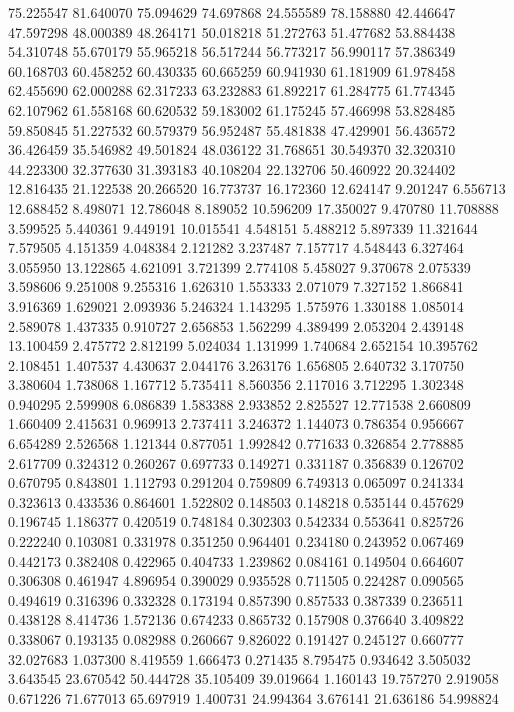 75.225547
81.640070
75.094629
74.697868
24.555589
78.158880
42.446647
47.597298
48.000389
48.264171
50.018218
51.272763
51.477682
53.884438
54.310748
55.670179
55.965218
56.517244
56.773217
56.990117
57.386349
60.168703
60.458252
60.430335
60.665259
60.941930
61.181909
61.978458
62.455690
62.000288
62.317233
63.232883
61.892217
61.284775
61.774345
62.107962
61.558168
60.620532
59.183002
61.175245
57.466998
53.828485
59.850845
51.227532
60.579379
56.952487
55.481838
47.429901
56.436572
36.426459
35.546982
49.501824
48.036122
31.768651
30.549370
32.320310
44.223300
32.377630
31.393183
40.108204
22.132706
50.460922
20.324402
12.816435
21.122538
20.266520
16.773737
16.172360
12.624147
9.201247
6.556713
12.688452
8.498071
12.786048
8.189052
10.596209
17.350027
9.470780
11.708888
3.599525
5.440361
9.449191
10.015541
4.548151
5.488212
5.897339
11.321644
7.579505
4.151359
4.048384
2.121282
3.237487
7.157717
4.548443
6.327464
3.055950
13.122865
4.621091
3.721399
2.774108
5.458027
9.370678
2.075339
3.598606
9.251008
9.255316
1.626310
1.553333
2.071079
7.327152
1.866841
3.916369
1.629021
2.093936
5.246324
1.143295
1.575976
1.330188
1.085014
2.589078
1.437335
0.910727
2.656853
1.562299
4.389499
2.053204
2.439148
13.100459
2.475772
2.812199
5.024034
1.131999
1.740684
2.652154
10.395762
2.108451
1.407537
4.430637
2.044176
3.263176
1.656805
2.640732
3.170750
3.380604
1.738068
1.167712
5.735411
8.560356
2.117016
3.712295
1.302348
0.940295
2.599908
6.086839
1.583388
2.933852
2.825527
12.771538
2.660809
1.660409
2.415631
0.969913
2.737411
3.246372
1.144073
0.786354
0.956667
6.654289
2.526568
1.121344
0.877051
1.992842
0.771633
0.326854
2.778885
2.617709
0.324312
0.260267
0.697733
0.149271
0.331187
0.356839
0.126702
0.670795
0.843801
1.112793
0.291204
0.759809
6.749313
0.065097
0.241334
0.323613
0.433536
0.864601
1.522802
0.148503
0.148218
0.535144
0.457629
0.196745
1.186377
0.420519
0.748184
0.302303
0.542334
0.553641
0.825726
0.222240
0.103081
0.331978
0.351250
0.964401
0.234180
0.243952
0.067469
0.442173
0.382408
0.422965
0.404733
1.239862
0.084161
0.149504
0.664607
0.306308
0.461947
4.896954
0.390029
0.935528
0.711505
0.224287
0.090565
0.494619
0.316396
0.332328
0.173194
0.857390
0.857533
0.387339
0.236511
0.438128
8.414736
1.572136
0.674233
0.865732
0.157908
0.376640
3.409822
0.338067
0.193135
0.082988
0.260667
9.826022
0.191427
0.245127
0.660777
32.027683
1.037300
8.419559
1.666473
0.271435
8.795475
0.934642
3.505032
3.643545
23.670542
50.444728
35.105409
39.019664
1.160143
19.757270
2.919058
0.671226
71.677013
65.697919
1.400731
24.994364
3.676141
21.636186
54.998824
